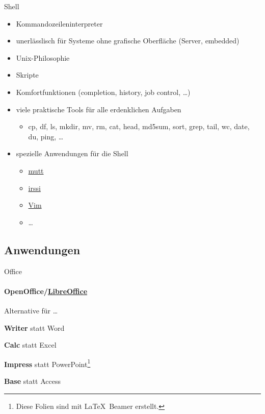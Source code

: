 \documentclass{beamer}
\makeatletter
\newcommand{\strong}[1]{\@strong{#1}}
\newcommand{\@@strong}[1]{\textbf{\let\@strong\@@@strong#1}}
\newcommand{\@@@strong}[1]{\textnormal{\let\@strong\@@strong#1}}
\let\@strong\@@strong
\makeatother
\begin{document}
\begin{frame}{Shell}
    \begin{itemize}
        \item Kommandozeileninterpreter
        \item unerlässlisch für Systeme ohne grafische Oberfläche
            (Server, embedded)
        \item Unix-Philosophie
        \item Skripte
        \item Komfortfunktionen (completion, history, job control, …)
        \item viele praktische Tools für alle erdenklichen Aufgaben
            \begin{itemize}
                \item cp, df, ls, mkdir, mv, rm, cat, head, md5sum,
                    sort, grep, tail, wc, date, du, ping, …
            \end{itemize}
        \item spezielle Anwendungen für die Shell
            \begin{itemize}
                \item \href{http://www.mutt.org/}{mutt}
                \item \href{https://irssi.org/}{irssi}
                \item \href{https://www.vim.org/}{Vim}
                \item …
            \end{itemize}
    \end{itemize}
\end{frame}

\subsection{Anwendungen}

\begin{frame}{Office}
    \framesubtitle{OpenOffice/\href{https://de.libreoffice.org/}{LibreOffice}}
    {
    }
    {
        \begin{block}{Alternative für …}
            \begin{description}[Tabellenkalkulation]
                \item[Textverarbeitung] \strong{Writer} statt Word
                \item[Tabellenkalkulation] \strong{Calc} statt Excel
                \item[Präsentation] \strong{Impress} statt
                    PowerPoint\footnote{Diese Folien sind mit
                    \LaTeX\ Beamer erstellt.}
                \item[Datenbank] \strong{Base} statt Access
            \end{description}
        \end{block}
    }
\end{frame}
\end{document}

